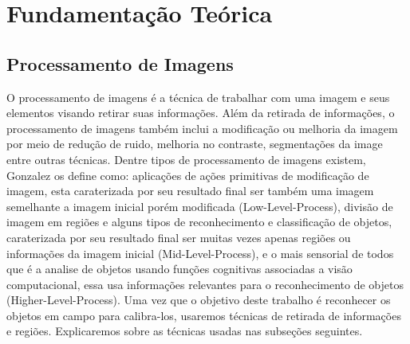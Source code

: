 \graphicspath{{figuras/}}
\chapter{Fundamentação Teórica} \label{Cap:Fundamentacao}


\section{Processamento de Imagens}

O processamento de imagens é a técnica de trabalhar com uma imagem e seus elementos visando retirar suas informações\cite{Albuquerque:2001}. Além da retirada de informações, o processamento de imagens também inclui a modificação ou melhoria da imagem por meio de redução de ruido, melhoria no contraste, segmentações da image entre outras técnicas. Dentre tipos de processamento de imagens existem, Gonzalez\cite{Gonzalez:2008} os define como: aplicações de ações primitivas de modificação de imagem, esta caraterizada por seu resultado final ser também uma imagem semelhante a imagem inicial porém modificada (Low-Level-Process), divisão de imagem em regiões e alguns tipos de reconhecimento e classificação de objetos, caraterizada por seu resultado final ser muitas vezes apenas regiões ou informações da imagem inicial (Mid-Level-Process), e o mais sensorial de todos que é a analise de objetos usando funções cognitivas associadas a visão computacional, essa usa informações relevantes para o reconhecimento de objetos (Higher-Level-Process). 
Uma vez que o objetivo deste trabalho é reconhecer os objetos em campo para calibra-los, usaremos técnicas de retirada de informações e regiões. Explicaremos sobre as técnicas usadas nas subseções seguintes.

